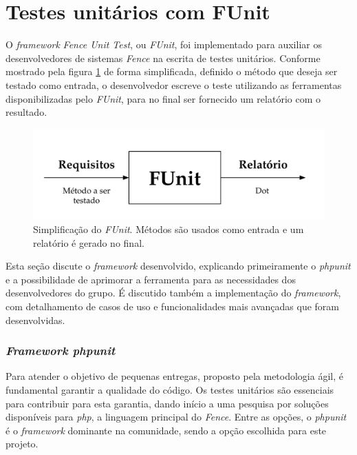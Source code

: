 \hypertarget{fence-unit-test}{%
\section{Testes unitários com FUnit}\label{fence-unit-test}}

O \emph{framework} \emph{Fence Unit Test}, ou \emph{FUnit}, foi implementado para auxiliar os desenvolvedores de sistemas \emph{Fence} na escrita de testes unitários. Conforme mostrado pela figura \ref{fig:funit-esq} de forma simplificada, definido o método que deseja ser testado como entrada, o desenvolvedor escreve o teste utilizando as ferramentas disponibilizadas pelo \emph{FUnit}, para no final ser fornecido um relatório com o resultado.

\begin{figure}[H]
    \centering
    \includegraphics[width=14cm]{source/4-solucao/images/funit-esq.png}
    \caption{Simplificação do \emph{FUnit}. Métodos são usados como entrada e um relatório é gerado no final.}
    \label{fig:funit-esq}
\end{figure}

Esta seção discute o \emph{framework} desenvolvido, explicando primeiramente o \emph{phpunit} e a possibilidade de aprimorar a ferramenta para as necessidades dos desenvolvedores do grupo. É discutido também a implementação do \emph{framework}, com detalhamento de casos de uso e funcionalidades mais avançadas que foram desenvolvidas.

\hypertarget{framework-phpunit}{%
\subsubsection{\texorpdfstring{\emph{Framework phpunit}}{Framework phpunit}}\label{framework-phpunit}}

Para atender o objetivo de pequenas entregas, proposto pela metodologia ágil, é fundamental garantir a qualidade do código. Os testes unitários são essenciais para contribuir para esta garantia, dando início a uma pesquisa por soluções disponíveis para \emph{php}, a linguagem principal do \emph{Fence}. Entre as opções, o \emph{phpunit} é o \emph{framework} dominante na comunidade, sendo a opção escolhida para este projeto.

